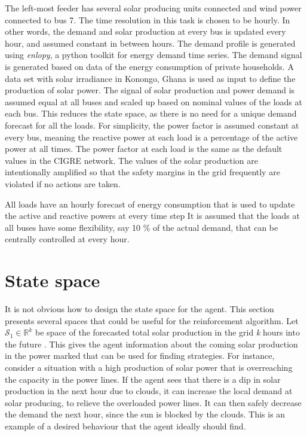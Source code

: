 \documentclass[class=book, crop=false]{standalone}
\begin{document}
The left-most feeder has several solar producing units connected and wind power connected to bus 7. The time resolution in this task is chosen to be hourly. In other words, the demand and solar production at every bus is updated every hour, and assumed constant in between hours. The demand profile is generated using \textit{enlopy}, a python toolkit for energy demand time series\cite{enlopy}. The demand signal is generated based on data of the energy consumption of private households. A data set with solar irradiance in Konongo, Ghana is used as input to define the production of solar power. The signal of solar production and power demand is assumed equal at all buses and scaled up based on nominal values of the loads at each bus. This reduces the state space, as there is no need for a unique demand forecast for all the loads.  For simplicity, the power factor is assumed constant at every bus, meaning the reactive power at each load is a percentage of the active power at all times. The power factor at each load is the same as the default values in the CIGRE network. The values of the solar production are intentionally amplified so that the safety margins in the grid frequently are violated if no actions are taken.  

All loads have an hourly forecast of energy consumption that is used to update the active and reactive powers at every time step It is assumed that the loads at all buses have some flexibility, say 10 \% of the actual demand, that can be centrally controlled at every hour. 

\section{State space}
It is not obvious how to design the state space for the agent. This section presents several spaces that could be useful for the reinforcement algorithm. Let $\mathcal{S}_{1} \in \mathbb{R}^{k}$ be space of the forecasted total solar production in the grid \textit{k} hours into the future . This gives the agent information about the coming solar production in the power marked that can be used for finding strategies. For instance, consider a situation with a high production of solar power that is overreaching the capacity in the power lines. If the agent sees that there is a dip in solar production in the next hour due to clouds, it can increase the local demand at solar producing, to relieve the overloaded power lines. It can then safely decrease the demand the next hour, since the sun is blocked by the clouds. This is an example of a desired behaviour that the agent ideally should find. 
\end{document}
